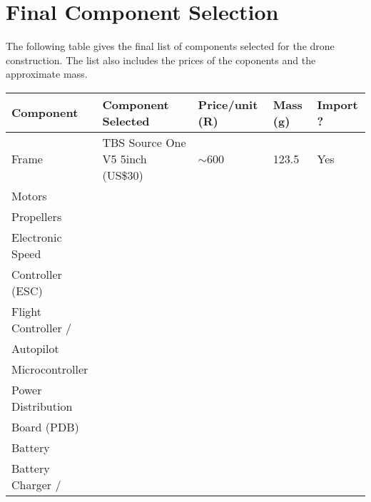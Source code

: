 \chapter{Final Component Selection}

The following table gives the final list of components selected for the drone construction. The list also includes the prices of the coponents and the approximate mass.

\begin{table}[H]
	\begin{center}
		\begin{tabular}{|l|l|l|l|l|}
		\hline
		Component              & Component Selected               & Price/unit (R)    & Mass (g)          & Import ? \\ \hline
		Frame                  & TBS Source One V5 5inch (US\$30) & $\sim$600         & 123.5             & Yes      \\
		Motors                 &                                  &                   &                   &          \\
		Propellers             &                                  &                   &                   &          \\
		Electronic Speed       & \multirow{2}{*}{}                & \multirow{2}{*}{} & \multirow{2}{*}{} &          \\
		Controller (ESC)       &                                  &                   &                   &          \\
		Flight Controller /    &                                  &                   &                   &          \\
		Autopilot              &                                  &                   &                   &          \\
		Microcontroller        &                                  &                   &                   &          \\
		Power Distribution     &                                  &                   &                   &          \\
		Board (PDB)            &                                  &                   &                   &          \\
		Battery                &                                  &                   &                   &          \\
		Battery Charger /      &                                  &                   &                   &          \\

\end{tabular}
\end{center}
\end{table}
